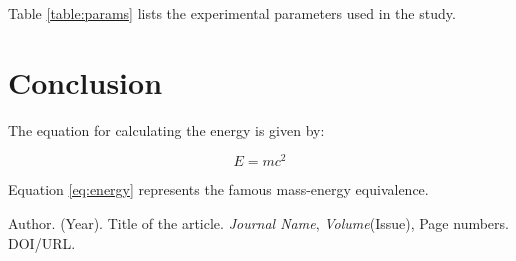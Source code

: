 \documentclass{article}
\begin{document}
Table \ref{table:params} lists the experimental parameters used in the study.

\section{Conclusion}
\lipsum[8] %

The equation for calculating the energy is given by:

\begin{equation}
    E = mc^2
    \label{eq:energy}
\end{equation}

Equation \ref{eq:energy} represents the famous mass-energy equivalence.

\begin{thebibliography}{9}
     Author. (Year). Title of the article. \textit{Journal Name}, \textit{Volume}(Issue), Page numbers. DOI/URL.
\end{thebibliography}
\end{document}
